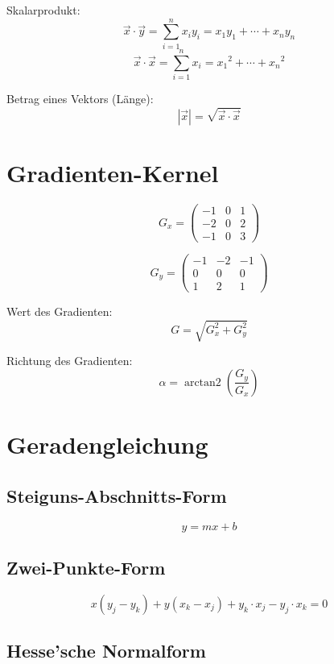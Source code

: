 Skalarprodukt:
\[ \vec x\cdot \vec y = \sum_{i=1}^n x_iy_i = {x_1}{y_1}+\dotsb + {x_n}{y_n} \]
\[ \vec x\cdot \vec x = \sum_{i=1}^n x_i = {x_1}^2 +\dotsb + {x_n}^2 \]

Betrag eines Vektors (Länge):
\[ |\vec x| = \sqrt{\vec x \cdot \vec x} \]






\section{Gradienten-Kernel}

\[ G_x = \begin{pmatrix}
-1 & 0 & 1 \\
-2 & 0 & 2 \\
-1 & 0 & 3
\end{pmatrix} \]

\[ G_y = \begin{pmatrix}
-1 & -2 & -1 \\
0 & 0 & 0 \\
1 & 2 & 1
\end{pmatrix} \]

Wert des Gradienten:
\[ G = \sqrt{G_x^2 + G_y^2} \]

Richtung des Gradienten:
\[ \alpha = \operatorname{arctan2}\left(\frac{G_y}{G_x}\right) \]





\columnbreak
\section{Geradengleichung}

\subsection{Steiguns-Abschnitts-Form}

\[ y = mx + b \]


\subsection{Zwei-Punkte-Form}

\begin{scriptsize}
	\[ x(y_j-y_k) + y(x_k-x_j) + y_k \cdot x_j - y_j \cdot x_k = 0 \]
\end{scriptsize}

\subsection{Hesse'sche Normalform}

